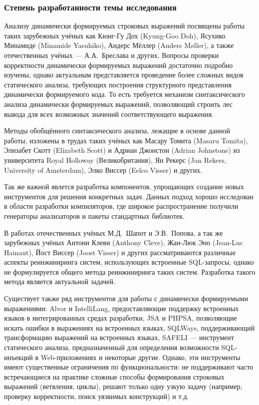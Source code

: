 \subsubsection*{\large{Степень разработанности темы исследования}}

Анализу динамически формируемых строковых выражений посвящены работы таких зарубежных учёных как Кюнг-Гу Дох (Kyung-Goo Doh), Ясухико Минамиде (Minamide Yasuhiko), Андерс Мёллер (Anders M{\o}ller), а также отечественных учёных --- А.А.~Бреслава и других. Вопросы проверки корректности динамически формируемых выражений достаточно подробно изучены, однако актуальным представляется проведение более сложных видов статического анализа, требующих построения структурного представления динамически формируемого кода. То есть требуется механизм синтаксического анализа динамически формируемых выражений, позволяющий строить лес вывода для всех возможных значений соответствующего выражения. 

Методы обобщённого синтаксического анализа, лежащие в основе данной работы, изложены в трудах таких учёных как Масару Томита (Masaru Tomita), Элизабет Скотт (Elizabeth Scott) и Адриан Джонстон (Adrian Johnstone) из университета Royal Holloway (Великобритания), Ян Рекерс (Jan Rekers, University of Amsterdam), Элко Виссер (Eelco Visser) и других.

Так же важной явлется разработка компонентов, упрощающих создание новых инструментов для решения конкретных задач. Данных подход хорошо исследован в области разработки компиляторов, где широкое распространение получили генераторы анализаторов и пакеты стандартных библиотек. 

В работах отечественных учёных М.Д.~Шапот  и Э.В.~Попова, а так же зарубежных учёных Антони Клеви (Anthony Cleve), Жан-Люк Эно (Jean-Luc Hainaut), Йост Виссер (Joost Visser) и других рассматриваются различные аспекты реинжиниринга систем, использующих встроенные SQL-запросы, однако не формулируется общего метода реинжиниринга таких систем. Разработка такого метода является актуальной задачей.

Существует также ряд инструментов для работы с динамически формируемыми выражениями: Alvor и IntelliLang, предоставляющие поддержку встроенных языков в интегрированных средах разработки, JSA и PHPSA, позволяющие искать ошибки в выражениях на встроенных языках, SQLWays, поддерживающий трансформацию выражений на встроенных языках, SAFELI --- инструмент статического анализа, предназначенный для определения возможности SQL-инъекций в Web-приложениях и некоторые другие. Однако, эти инструменты имеют существенные ограничения по функциональности: не поддерживают часто встречающиеся на практике сложные способы формирования строковых выражений (ветвления, циклы), решают только одну узкую задачу (например, проверку корректности, поиск уязвимых конструкций) и т.д.

